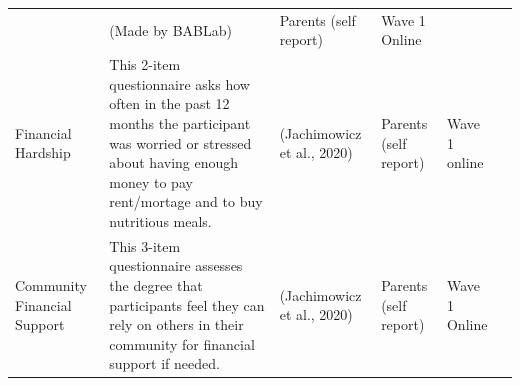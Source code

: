 \documentclass[]{book}
\begin{document}
\begin{longtable}[]{@{}llllll@{}}
\begin{minipage}[t]{0.18\columnwidth}
\end{minipage} & \begin{minipage}[t]{0.15\columnwidth}\raggedright
(Made by BABLab)\strut
\end{minipage} & \begin{minipage}[t]{0.16\columnwidth}\raggedright
Parents (self report)\strut
\end{minipage} & \begin{minipage}[t]{0.06\columnwidth}\raggedright
Wave 1 Online\strut
\end{minipage} & \begin{minipage}[t]{0.10\columnwidth}\raggedright
\strut
\end{minipage}\tabularnewline
\begin{minipage}[t]{0.18\columnwidth}\raggedright
Financial Hardship\strut
\end{minipage} & \begin{minipage}[t]{0.18\columnwidth}\raggedright
This 2-item questionnaire asks how often in the past 12 months the participant was worried or stressed about having enough money to pay rent/mortage and to buy nutritious meals.\strut
\end{minipage} & \begin{minipage}[t]{0.15\columnwidth}\raggedright
(Jachimowicz et al., 2020)\strut
\end{minipage} & \begin{minipage}[t]{0.16\columnwidth}\raggedright
Parents (self report)\strut
\end{minipage} & \begin{minipage}[t]{0.06\columnwidth}\raggedright
Wave 1 online\strut
\end{minipage} & \begin{minipage}[t]{0.10\columnwidth}\raggedright
\strut
\end{minipage}\tabularnewline
\begin{minipage}[t]{0.18\columnwidth}\raggedright
Community Financial Support\strut
\end{minipage} & \begin{minipage}[t]{0.18\columnwidth}\raggedright
This 3-item questionnaire assesses the degree that participants feel they can rely on others in their community for financial support if needed.\strut
\end{minipage} & \begin{minipage}[t]{0.15\columnwidth}\raggedright
(Jachimowicz et al., 2020)\strut
\end{minipage} & \begin{minipage}[t]{0.16\columnwidth}\raggedright
Parents (self report)\strut
\end{minipage} & \begin{minipage}[t]{0.06\columnwidth}\raggedright
Wave 1 Online\strut
\end{minipage} & \begin{minipage}[t]{0.10\columnwidth}\raggedright
\strut
\end{minipage}\tabularnewline
\bottomrule
\end{longtable}
\end{document}

